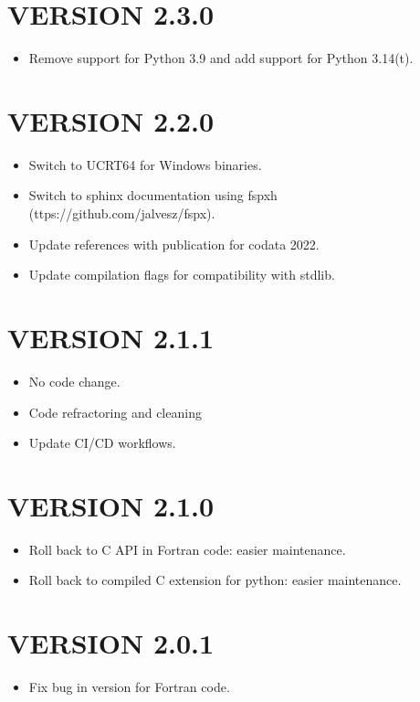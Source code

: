 \section*{VERSION 2.3.0}
\begin{itemize}
\item Remove support for Python 3.9 and add support for Python 3.14(t).
\end{itemize}



\section*{VERSION 2.2.0}
\begin{itemize}
\item Switch to UCRT64 for Windows binaries.
\item Switch to sphinx documentation using fspxh (ttps://github.com/jalvesz/fspx).
\item Update references with publication for codata 2022.
\item Update compilation flags for compatibility with stdlib.
\end{itemize}



\section*{VERSION 2.1.1}
\begin{itemize}
\item No code change.
\item Code refractoring and cleaning
\item Update CI/CD workflows.
\end{itemize}



\section*{VERSION 2.1.0}
\begin{itemize}
\item Roll back to C API in Fortran code: easier maintenance.
\item Roll back to compiled C extension for python: easier maintenance.
\end{itemize}



\section*{VERSION 2.0.1}
\begin{itemize}
\item Fix bug in version for Fortran code.
\end{itemize}



